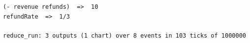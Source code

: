 \begin{lstlisting}[language={},basicstyle=\ttfamily\footnotesize,breaklines=true]
(- revenue refunds)  =>  10
refundRate  =>  1/3

reduce_run: 3 outputs (1 chart) over 8 events in 103 ticks of 1000000
\end{lstlisting}
